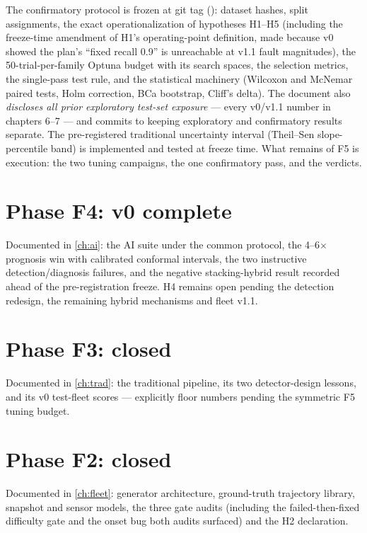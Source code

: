The confirmatory protocol is frozen at git tag 
(): dataset hashes, split assignments, the exact
operationalization of hypotheses H1--H5 (including the freeze-time amendment of H1's
operating-point definition, made because v0 showed the plan's ``fixed recall 0.9'' is
unreachable at v1.1 fault magnitudes), the 50-trial-per-family Optuna budget with its search
spaces, the selection metrics, the single-pass test rule, and the statistical machinery
(Wilcoxon and McNemar paired tests, Holm correction, BCa bootstrap, Cliff's delta). The
document also \emph{discloses all prior exploratory test-set exposure} --- every v0/v1.1
number in chapters 6--7 --- and commits to keeping exploratory and confirmatory results
separate. The pre-registered traditional uncertainty interval (Theil--Sen slope-percentile
band) is implemented and tested at freeze time. What remains of F5 is execution: the two
tuning campaigns, the one confirmatory pass, and the verdicts.

\section{Phase F4: v0 complete}

Documented in \cref{ch:ai}: the AI suite under the common protocol, the 4--6$\times$
prognosis win with calibrated conformal intervals, the two instructive detection/diagnosis
failures, and the negative stacking-hybrid result recorded ahead of the pre-registration
freeze. H4 remains open pending the detection redesign, the remaining hybrid mechanisms and
fleet v1.1.

\section{Phase F3: closed}

Documented in \cref{ch:trad}: the traditional pipeline, its two detector-design lessons, and
its v0 test-fleet scores --- explicitly floor numbers pending the symmetric F5 tuning budget.

\section{Phase F2: closed}

Documented in \cref{ch:fleet}: generator architecture, ground-truth trajectory library,
snapshot and sensor models, the three gate audits (including the failed-then-fixed difficulty
gate and the onset bug both audits surfaced) and the H2 declaration.

